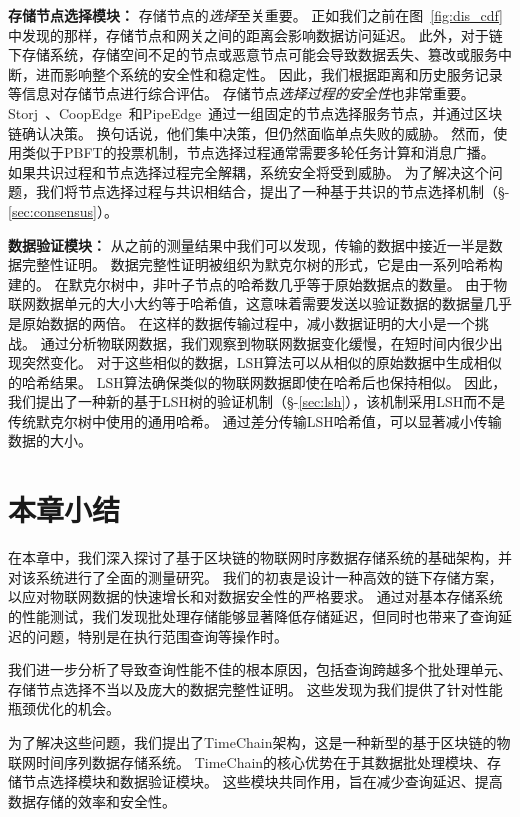 \textbf{存储节点选择模块：}
存储节点的\textit{选择}至关重要。
正如我们之前在图~\autoref{fig:dis_cdf}中发现的那样，存储节点和网关之间的距离会影响数据访问延迟。
此外，对于链下存储系统，存储空间不足的节点或恶意节点可能会导致数据丢失、篡改或服务中断，进而影响整个系统的安全性和稳定性。
因此，我们根据距离和历史服务记录等信息对存储节点进行综合评估。
存储节点\textit{选择过程的安全性}也非常重要。
Storj~\cite{storj2018storj}、CoopEdge~\cite{yuan2021coopedge}和PipeEdge~\cite{yuan2023pipeedge}通过一组固定的节点选择服务节点，并通过区块链确认决策。
换句话说，他们集中决策，但仍然面临单点失败的威胁。
然而，使用类似于PBFT的投票机制，节点选择过程通常需要多轮任务计算和消息广播。
如果共识过程和节点选择过程完全解耦，系统安全将受到威胁。
为了解决这个问题，我们将节点选择过程与共识相结合，提出了一种基于共识的节点选择机制（§-\ref{sec:consensus}）。

\textbf{数据验证模块：}
从之前的测量结果中我们可以发现，传输的数据中接近一半是数据完整性证明。
数据完整性证明被组织为默克尔树的形式，它是由一系列哈希构建的。
在默克尔树中，非叶子节点的哈希数几乎等于原始数据点的数量。
由于物联网数据单元的大小大约等于哈希值，这意味着需要发送以验证数据的数据量几乎是原始数据的两倍。
在这样的数据传输过程中，减小数据证明的大小是一个挑战。
通过分析物联网数据，我们观察到物联网数据变化缓慢，在短时间内很少出现突然变化。
对于这些相似的数据，LSH算法可以从相似的原始数据中生成相似的哈希结果。
LSH算法确保类似的物联网数据即使在哈希后也保持相似。
因此，我们提出了一种新的基于LSH树的验证机制（§-\ref{sec:lsh}），该机制采用LSH而不是传统默克尔树中使用的通用哈希。
通过差分传输LSH哈希值，可以显著减小传输数据的大小。

\section{本章小结}
在本章中，我们深入探讨了基于区块链的物联网时序数据存储系统的基础架构，并对该系统进行了全面的测量研究。
我们的初衷是设计一种高效的链下存储方案，以应对物联网数据的快速增长和对数据安全性的严格要求。
通过对基本存储系统的性能测试，我们发现批处理存储能够显著降低存储延迟，但同时也带来了查询延迟的问题，特别是在执行范围查询等操作时。

我们进一步分析了导致查询性能不佳的根本原因，包括查询跨越多个批处理单元、存储节点选择不当以及庞大的数据完整性证明。
这些发现为我们提供了针对性能瓶颈优化的机会。

为了解决这些问题，我们提出了TimeChain架构，这是一种新型的基于区块链的物联网时间序列数据存储系统。
TimeChain的核心优势在于其数据批处理模块、存储节点选择模块和数据验证模块。
这些模块共同作用，旨在减少查询延迟、提高数据存储的效率和安全性。

